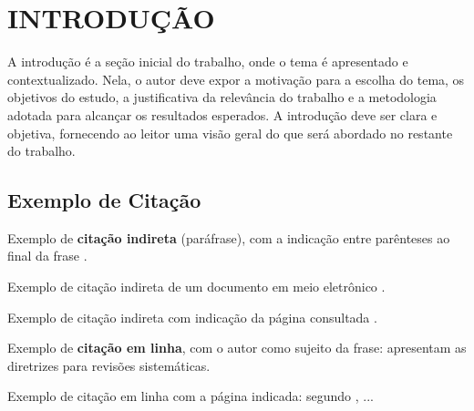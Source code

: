 \chapter[Introdução]{INTRODUÇÃO} \label{sec:introducao}
A introdução é a seção inicial do trabalho, onde o tema é apresentado e contextualizado.
Nela, o autor deve expor a motivação para a escolha do tema, os objetivos do estudo, a justificativa da relevância do trabalho e a metodologia adotada para alcançar os resultados esperados.
A introdução deve ser clara e objetiva, fornecendo ao leitor uma visão geral do que será abordado no restante do trabalho.
%

\section{Exemplo de Citação}

Exemplo de \textbf{citação indireta} (paráfrase), com a indicação entre parênteses ao final
da frase \cite{kitchenham2007guidelines}.

Exemplo de citação indireta de um documento em meio eletrônico
\cite{kitchenham2007guidelinesOnline}.

Exemplo de citação indireta com indicação da página consultada
\cite[p. 15]{kitchenham2007guidelines}.

Exemplo de \textbf{citação em linha}, com o autor como sujeito da frase:
 apresentam as diretrizes para revisões sistemáticas.

Exemplo de citação em linha com a página indicada: segundo
, ...